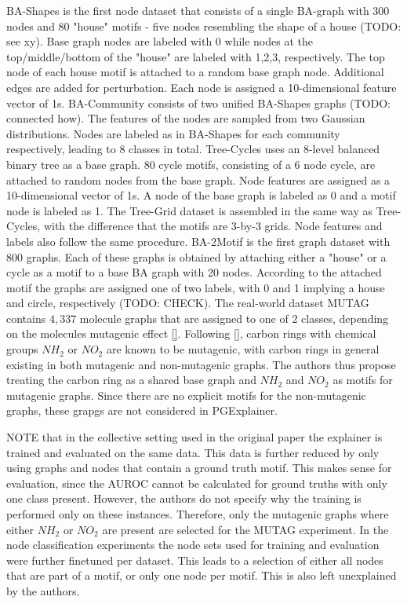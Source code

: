 BA-Shapes is the first node dataset that consists of a single BA-graph with 300 nodes and 80 "house" motifs - five nodes resembling the shape of a house (TODO: see xy). Base graph nodes are labeled with 0 while nodes at the top/middle/bottom of the "house" are labeled with 1,2,3, respectively. The top node of each house motif is attached to a random base graph node. Additional edges are added for perturbation. Each node is assigned a 10-dimensional feature vector of 1s.
BA-Community consists of two unified BA-Shapes graphs (TODO: connected how). The features of the nodes are sampled from two Gaussian distributions. Nodes are labeled as in BA-Shapes for each community respectively, leading to 8 classes in total.
Tree-Cycles uses an 8-level balanced binary tree as a base graph. 80 cycle motifs, consisting of a 6 node cycle, are attached to random nodes from the base graph. Node features are assigned as a 10-dimensional vector of 1s. A node of the base graph is labeled as 0 and a motif node is labeled as 1.
The Tree-Grid dataset is assembled in the same way as Tree-Cycles, with the difference that the motifs are 3-by-3 grids. Node features and labels also follow the same procedure.
BA-2Motif is the first graph dataset with 800 graphs. Each of these graphs is obtained by attaching either a "house" or a cycle as a motif to a base BA graph with 20 nodes. According to the attached motif the graphs are assigned one of two labels, with 0 and 1 implying a house and circle, respectively (TODO: CHECK).
The real-world dataset MUTAG contains $4,337$ molecule graphs that are assigned to one of 2 classes, depending on the molecules mutagenic effect \ref{}. Following \ref{}, carbon rings with chemical groups $NH_2$ or $NO_2$ are known to be mutagenic, with carbon rings in general existing in both mutagenic and non-mutagenic graphs. The authors thus propose treating the carbon ring as a shared base graph and $NH_2$ and $NO_2$ as motifs for mutagenic graphs. Since there are no explicit motifs for the non-mutagenic graphs, these grapgs are not considered in PGExplainer.

NOTE that in the collective setting used in the original paper the explainer is trained and evaluated on the same data. This data is further reduced by only using graphs and nodes that contain a ground truth motif. This makes sense for evaluation, since the AUROC cannot be calculated for ground truths with only one class present. However, the authors do not specify why the training is performed only on these instances. Therefore, only the mutagenic graphs where either $NH_2$ or $NO_2$ are present are selected for the MUTAG experiment. In the node classification experiments the node sets used for training and evaluation were further finetuned per dataset. This leads to a selection of either all nodes that are part of a motif, or only one node per motif. This is also left unexplained by the authors.

